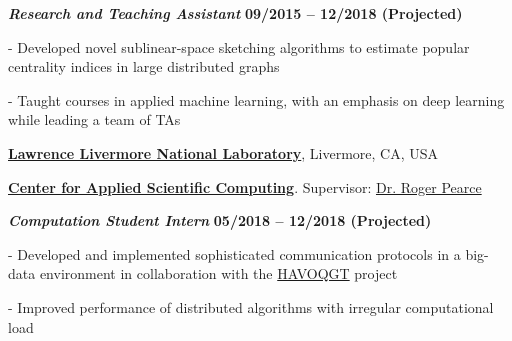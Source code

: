 \documentclass[10pt]{article}
\newcommand{\halfblankline}{\quad\vspace{-0.5\baselineskip}\pagebreak[3]}
\begin{document}
\begin{outerlist}

\item[] \textbf{\textit{Research and Teaching Assistant}}%
\hfill \textbf{09/2015 -- 12/2018 (Projected)}

\begin{innerlist}

\item[-] Developed novel sublinear-space sketching algorithms to estimate popular centrality indices in large distributed graphs 

%

\item[-] Taught courses in applied machine learning, with an emphasis on deep learning while leading a team of TAs

\end{innerlist}
\end{outerlist}






\halfblankline



\href{https://www.llnl.gov/}{\textbf{Lawrence Livermore National Laboratory}},
Livermore, CA, USA

\href{https://computation.llnl.gov/casc/}{\textbf{Center for Applied Scientific Computing}}.
Supervisor:               
\href{https://people.llnl.gov/pearce7}
{Dr. Roger Pearce}

\vspace{-0.5em}
\begin{outerlist}

\item[] \textbf{\textit{Computation Student Intern}}%
\hfill \textbf{05/2018 -- 12/2018 (Projected)}

\begin{innerlist}

\item[-] Developed and implemented sophisticated communication protocols in a big-data environment in collaboration with the \href{https://github.com/LLNL/havoqgt}{HAVOQGT} project
\item[-] Improved performance of distributed algorithms with irregular computational load

%
%

\end{innerlist}
\end{outerlist}
\end{document}
